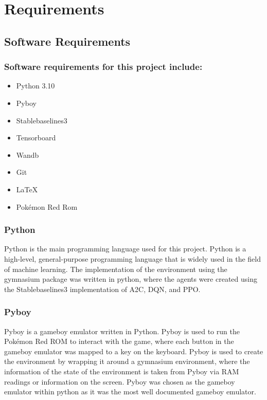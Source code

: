\section{Requirements}

\subsection{Software Requirements}

\subsubsection*{Software requirements for this project include:}


\begin{itemize}
    \item Python 3.10
    \item Pyboy
    \item Stablebaselines3
    \item Tensorboard
    \item Wandb
    \item Git
    \item LaTeX
    \item Pokémon Red Rom
\end{itemize}

\subsubsection*{Python}
Python is the main programming language used for this project. Python is a high-level, general-purpose programming language that is widely used in the field of machine learning. The implementation of the environment using the gymnasium package was written in python, where the agents were created using the Stablebaselines3 implementation of A2C, DQN, and PPO.

\subsubsection*{Pyboy}
Pyboy is a gameboy emulator written in Python. Pyboy is used to run the Pokémon Red ROM to interact with the game, where each button in the gameboy emulator was mapped to a key on the keyboard. Pyboy is used to create the environment by wrapping it around a gymnasium environment, where the information of the state of the environment is taken from Pyboy via RAM readings or information on the screen. Pyboy was chosen as the gameboy emulator within python as it was the most well documented gameboy emulator.

